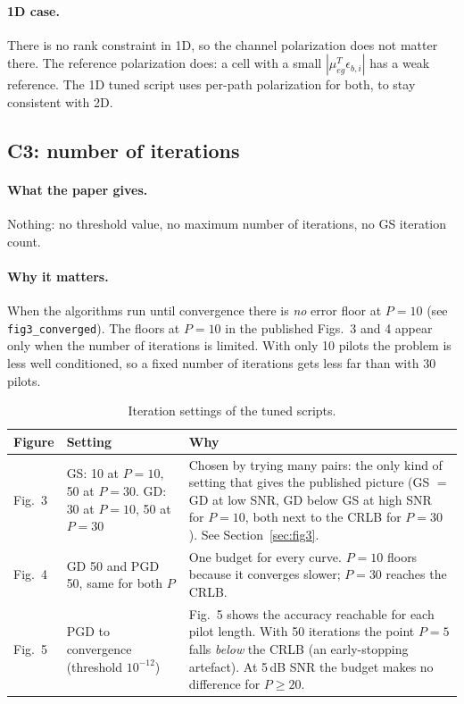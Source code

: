 \documentclass[11pt,a4paper]{article}
\newcommand{\Crow}{\rowcolor{changed}}
\newcommand{\file}[1]{\texttt{#1}}
\begin{document}
\paragraph{1D case.} There is no rank constraint in 1D, so the channel polarization does not matter
there. The reference polarization does: a cell with a small $|\mu_{eg}^T\epsilon_{b,i}|$ has a weak
reference. The 1D tuned script uses per-path polarization for both, to stay consistent with 2D.

\subsection{C3: number of iterations}
\label{sec:c3}

\paragraph{What the paper gives.} Nothing: no threshold value, no maximum number of iterations, no
GS iteration count.

\paragraph{Why it matters.} When the algorithms run until convergence there is \emph{no} error floor
at $P=10$ (see \file{fig3\_converged}). The floors at $P=10$ in the published Figs.~3 and 4 appear
only when the number of iterations is limited. With only 10 pilots the problem is less well
conditioned, so a fixed number of iterations gets less far than with 30 pilots.

\begin{table}[h!]
\centering
\small
\caption{Iteration settings of the tuned scripts.}
\label{tab:iters}
\begin{tabularx}{\textwidth}{L{2.0cm} L{4.6cm} Y}
\toprule
Figure & Setting & Why \\
\midrule
\Crow Fig.~3 & GS: 10 at $P=10$, 50 at $P=30$. GD: 30 at $P=10$, 50 at $P=30$ & Chosen by trying many pairs: the only kind of setting that gives the published picture (GS $=$ GD at low SNR, GD below GS at high SNR for $P=10$, both next to the CRLB for $P=30$). See Section~\ref{sec:fig3}. \\
\Crow Fig.~4 & GD 50 and PGD 50, same for both $P$ & One budget for every curve. $P=10$ floors because it converges slower; $P=30$ reaches the CRLB. \\
\Crow Fig.~5 & PGD to convergence (threshold $10^{-12}$) & Fig.~5 shows the accuracy reachable for each pilot length. With 50 iterations the point $P=5$ falls \emph{below} the CRLB (an early-stopping artefact). At 5\,dB SNR the budget makes no difference for $P\ge20$. \\
\bottomrule
\end{tabularx}
\end{table}
\end{document}
